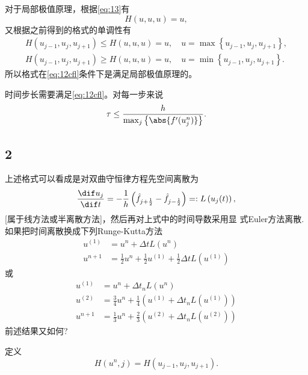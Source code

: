 \documentclass[12pt]{article}
\begin{document}
对于局部极值原理，根据\cref{eq:13}有
\begin{equation}
	H(u,u,u) = u,
	\label{eq:14}
\end{equation}
又根据之前得到的格式的单调性有
\begin{align}
	H(u_{j-1},u_{j},u_{j+1}) \leq H(u,u,u) = u,\quad u = \max{\left\{u_{j-1},u_{j},u_{j+1}\right\}}, \\
	H(u_{j-1},u_{j},u_{j+1}) \geq H(u,u,u) = u,\quad u = \min{\left\{u_{j-1},u_{j},u_{j+1}\right\}}.
\end{align}
所以格式在\cref{eq:12cfl}条件下是满足局部极值原理的。

时间步长需要满足\cref{eq:12cfl}。对每一步来说
\begin{equation}
	\tau \leq \frac{h}{\max_j\left\{\abs{f'(u^n_j)}\right\}}.
\end{equation}


\subsection{2}


上述格式可以看成是对双曲守恒律方程先空间离散为
\begin{equation}
	\frac{\dif u_{j}}{\dif t}=-\frac{1}{h}\left(\hat{f}_{j+\frac{1}{2}}-\hat{f}_{j-\frac{1}{2}}\right)=: L\left(u_{j}(t)\right),
\end{equation}
[属于线方法或半离散方法]，然后再对上式中的时间导数采用显 式Euler方法离散. 如果把时间离散换成下列Runge-Kutta方法
\begin{align}
	u^{(1)} & =u^{n}+\Delta t L\left(u^{n}\right)                                               \\
	u^{n+1} & =\frac{1}{2} u^{n}+\frac{1}{2} u^{(1)}+\frac{1}{2} \Delta t L\left(u^{(1)}\right)
\end{align}
或
\begin{align}
	u^{(1)} & =u^{n}+\Delta t_{n} L\left(u^{n}\right)                                               \\
	u^{(2)} & =\frac{3}{4} u^{n}+\frac{1}{4}\left(u^{(1)}+\Delta t_{n} L\left(u^{(1)}\right)\right) \\
	u^{n+1} & =\frac{1}{3} u^{n}+\frac{2}{3}\left(u^{(2)}+\Delta t_{n} L\left(u^{(2)}\right)\right)
\end{align}
前述结果又如何?


定义
\begin{equation}
	H\left(u^n,j\right) = H \left(u_{j-1},u_{j},u_{j+1}\right).
\end{equation}
\end{document}
